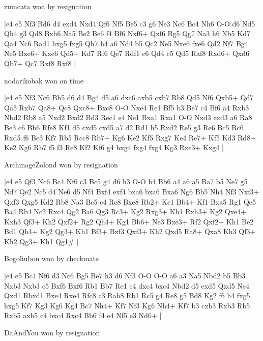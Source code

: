 zumcata won by resignation

\makegametitle
|e4 e5 Nf3 Bd6 d4 exd4 Nxd4 Qf6 Nf5 Be5 c3 g6 Ne3 Nc6 Bc4 Nh6 O-O d6 Nd5 Qh4 g3 Qd8 Bxh6 Na5 Be2 Be6 f4 Bf6 Nxf6+ Qxf6 Bg5 Qg7 Na3 h6 Nb5 Kd7 Qa4 Nc6 Rad1 hxg5 fxg5 Qh7 h4 a6 Nd4 b5 Qc2 Ne5 Nxe6 fxe6 Qd2 Nf7 Bg4 Ne5 Bxe6+ Kxe6 Qd5+ Kd7 Rf6 Qe7 Rdf1 c6 Qd4 c5 Qd5 Raf8 Rxd6+ Qxd6 Qb7+ Qc7 Rxf8 Rxf8  |

\showboard

nodarikobak won on time

\makegametitle
|e4 e5 Nf3 Nc6 Bb5 d6 d4 Bg4 d5 a6 dxc6 axb5 cxb7 Rb8 Qd5 Nf6 Qxb5+ Qd7 Qa5 Rxb7 Qa8+ Qc8 Qxc8+ Bxc8 O-O Nxe4 Re1 Bf5 b3 Be7 c4 Bf6 a4 Rxb3 Nbd2 Rb8 a5 Nxd2 Bxd2 Bd3 Rec1 e4 Ne1 Bxa1 Rxa1 O-O Nxd3 exd3 a6 Ra8 Be3 c6 Bb6 Rfe8 Kf1 d5 cxd5 cxd5 a7 d2 Rd1 h5 Rxd2 Re5 g3 Re6 Bc5 Rc6 Rxd5 f6 Be3 Kf7 Rb5 Rcc8 Rb7+ Kg6 Ke2 Kf5 Rxg7 Ke4 Re7+ Kf5 Kd3 Rd8+ Ke2 Kg6 Rb7 f5 f3 Re8 Kf2 Kf6 g4 hxg4 fxg4 fxg4 Kg3 Rxe3+ Kxg4  |

\showboard

ArchmageZolond won by resignation

\makegametitle
|e4 e5 Qf3 Nc6 Bc4 Nf6 c3 Bc5 g4 d6 h3 O-O b4 Bb6 a4 a6 a5 Ba7 b5 Ne7 g5 Nd7 Qe2 Nc5 d4 Ne6 d5 Nf4 Bxf4 exf4 bxa6 bxa6 Bxa6 Ng6 Bb5 Nh4 Nf3 Nxf3+ Qxf3 Qxg5 Kd2 Rb8 Na3 Bc5 c4 Re8 Bxe8 Rb2+ Ke1 Bb4+ Kf1 Bxa5 Rg1 Qe5 Ba4 Rb4 Nc2 Rxc4 Qg2 Ba6 Qg3 Rc3+ Kg2 Rxg3+ Kh1 Rxh3+ Kg2 Qxe4+ Kxh3 Qf3+ Kh2 Qxf2+ Rg2 Qh4+ Kg1 Bb6+ Ne3 Bxe3+ Rf2 Qxf2+ Kh1 Be2 Bd1 Qh4+ Kg2 Qg3+ Kh1 Bf3+ Bxf3 Qxf3+ Kh2 Qxd5 Ra8+ Qxa8 Kh3 Qf3+ Kh2 Qg3+ Kh1 Qg1\#  |

\showboard

Bogoliubon won by checkmate

\makegametitle
|e4 e5 Bc4 Nf6 d3 Nc6 Bg5 Be7 h3 d6 Nf3 O-O O-O a6 a3 Na5 Nbd2 b5 Bb3 Nxb3 Nxb3 c5 Bxf6 Bxf6 Rb1 Bb7 Re1 c4 dxc4 bxc4 Nbd2 d5 exd5 Qxd5 Ne4 Qxd1 Rbxd1 Bxe4 Rxe4 Rfc8 c3 Rab8 Rb1 Rc5 g4 Re8 g5 Bd8 Kg2 f6 h4 fxg5 hxg5 Kf7 Kg3 Kg6 Kg4 Bc7 Nh4+ Kf7 Nf3 Kg6 Nh4+ Kf7 b3 cxb3 Rxb3 Rb5 Rxb5 axb5 c4 bxc4 Rxc4 Bb6 f4 e4 Nf5 e3 Nd6+  |

\showboard

DaAndYou won by resignation

